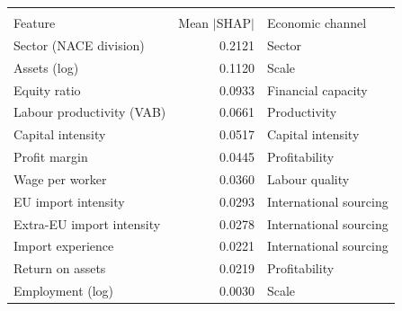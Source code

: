 \begin{table}[!ht]
 \label{tab:shap_importance}
\centering
\begin{tabular}{lrl}
\hline
 & & \\
Feature & Mean $|$SHAP$|$ & Economic channel \\
\hline
Sector (NACE division) & 0.2121 & Sector \\
Assets (log) & 0.1120 & Scale \\
Equity ratio & 0.0933 & Financial capacity \\
Labour productivity (VAB) & 0.0661 & Productivity \\
Capital intensity & 0.0517 & Capital intensity \\
Profit margin & 0.0445 & Profitability \\
Wage per worker & 0.0360 & Labour quality \\
EU import intensity & 0.0293 & International sourcing \\
Extra-EU import intensity & 0.0278 & International sourcing \\
Import experience & 0.0221 & International sourcing \\
Return on assets & 0.0219 & Profitability \\
Employment (log) & 0.0030 & Scale \\
\hline
\end{tabular}
\end{table}
